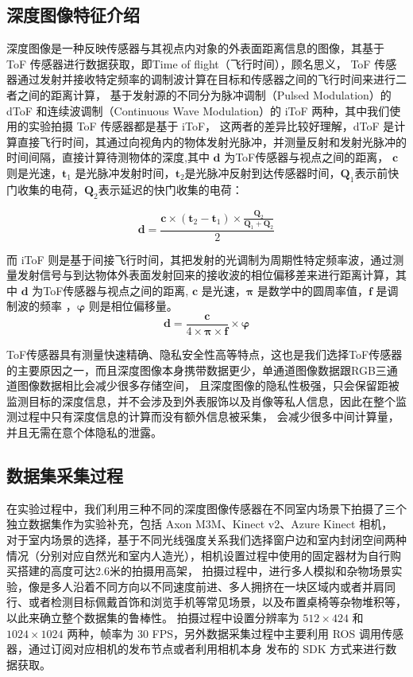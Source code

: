 \subsection{深度图像特征介绍}
深度图像是一种反映传感器与其视点内对象的外表面距离信息的图像，其基于 ToF 传感器进行数据获取，即Time of flight（飞行时间），顾名思义，
ToF 传感器通过发射并接收特定频率的调制波计算在目标和传感器之间的飞行时间来进行二者之间的距离计算，
基于发射源的不同分为脉冲调制（Pulsed Modulation）的 dToF 和连续波调制（Continuous Wave Modulation）的 iToF 两种，其中我们使用的实验拍摄 ToF 传感器都是基于 iToF，
这两者的差异比较好理解，dToF 是计算直接飞行时间，其通过向视角内的物体发射光脉冲，并测量反射和发射光脉冲的时间间隔，直接计算待测物体的深度,其中 $\bm{d}$ 为ToF传感器与视点之间的距离，
$\bm{c}$ 则是光速，$\bm{t}_1$ 是光脉冲发射时间，$\bm{t}_2$是光脉冲反射到达传感器时间，$\bm{Q}_1$表示前快门收集的电荷，$\bm{Q}_2$表示延迟的快门收集的电荷：

\begin{equation}
	\bm{d} = \frac{\bm{c} \times \left(\bm{t}_2 - \bm{t}_1\right) \times \frac{\bm{Q}_2}{\bm{Q}_1 + \bm{Q}_2}}{2}
	\label{eq2-1}
\end{equation}
\vspace{1mm}

而 iToF 则是基于间接飞行时间，其把发射的光调制为周期性特定频率波，通过测量发射信号与到达物体外表面发射回来的接收波的相位偏移差来进行距离计算，其中 $\bm{d}$ 为ToF传感器与视点之间的距离,
$\bm{c}$ 是光速，$\bm{\pi}$ 是数学中的圆周率值，$\bm{f}$ 是调制波的频率 ，$\bm{\varphi}$ 则是相位偏移量。
\begin{equation}
	\bm{d} = \frac{\bm{c}}{4 \times \bm{\pi} \times \bm{f}} \times \bm{\varphi}
	\label{eq2-2}
\end{equation}

ToF传感器具有测量快速精确、隐私安全性高等特点，这也是我们选择ToF传感器的主要原因之一，而且深度图像本身携带数据更少，单通道图像数据跟RGB三通道图像数据相比会减少很多存储空间，
且深度图像的隐私性极强，只会保留距被监测目标的深度信息，并不会涉及到外表服饰以及肖像等私人信息，因此在整个监测过程中只有深度信息的计算而没有额外信息被采集，
会减少很多中间计算量，并且无需在意个体隐私的泄露。

\subsection{数据集采集过程}
在实验过程中，我们利用三种不同的深度图像传感器在不同室内场景下拍摄了三个独立数据集作为实验补充，包括 Axon M3M、Kinect v2、Azure Kinect 相机，
对于室内场景的选择，基于不同光线强度关系我们选择窗户边和室内封闭空间两种情况（分别对应自然光和室内人造光），相机设置过程中使用的固定器材为自行购买搭建的高度可达2.6米的拍摄用高架，
拍摄过程中，进行多人模拟和杂物场景实验，像是多人沿着不同方向以不同速度前进、多人拥挤在一块区域内或者并肩同行、或者检测目标佩戴首饰和浏览手机等常见场景，以及布置桌椅等杂物堆积等，
以此来确立整个数据集的鲁棒性。
拍摄过程中设置分辨率为 $512 \times 424$ 和 $1024 \times 1024$ 两种，帧率为 30 FPS，另外数据采集过程中主要利用 ROS 调用传感器，通过订阅对应相机的发布节点或者利用相机本身
发布的 SDK 方式来进行数据获取。

